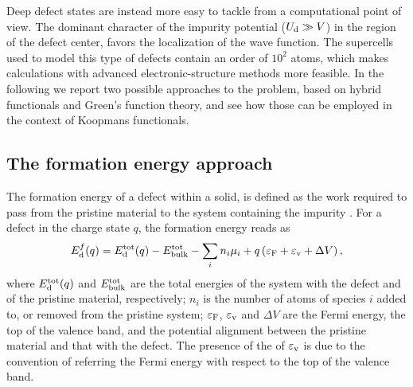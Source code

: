 Deep defect states are instead more easy to tackle from a computational point of view. The dominant character of the impurity potential ($U_{\rm d} \gg V$) in the region of the defect center, favors the localization of the wave function. The supercells used to model this type of defects contain an order of $10^2$ atoms, which makes calculations with advanced electronic-structure methods more feasible. In the following we report two possible approaches to the problem, based on hybrid functionals and Green's function theory, and see how those can be employed in the context of Koopmans functionals.

\subsection{The formation energy approach\label{sec:formation-energy-approach}}
The formation energy of a defect within a solid, is defined as the work required to pass from the pristine material to the system containing the impurity \cite{van_de_walle_first-principles_2004}. For a defect in the charge state $q$, the formation energy reads as
%
\begin{equation}
    E^f_{\rm d}(q) = E^{\rm tot}_{\rm d}(q) - E^{\rm tot}_{\rm bulk} - \sum_i n_i \mu_i + q \left( \varepsilon_{\rm F} + \varepsilon_{\rm v} + \Delta V \right) ,
    \label{eq:formation-energy}
\end{equation}
%
where $E^{\rm tot}_{\rm d}(q)$ and $E^{\rm tot}_{\rm bulk}$ are the total energies of the system with the defect and of the pristine material, respectively; $n_i$ is the number of atoms of species $i$ added to, or removed from the pristine system; $\varepsilon_{\rm F}$, $\varepsilon_{\rm v}$ and $\Delta V$ are the Fermi energy, the top of the valence band, and the potential alignment between the pristine material and that with the defect. The presence of the of $\varepsilon_{\rm v}$ is due to the convention of referring the Fermi energy with respect to the top of the valence band.

